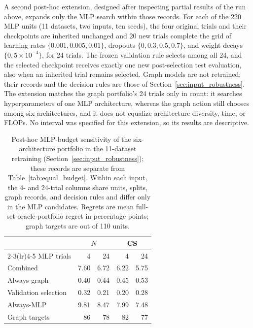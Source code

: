 A second post-hoc extension, designed after inspecting partial results of the run above, expands only the MLP search within those records. For each of the 220 MLP units (11 datasets, two inputs, ten seeds), the four original trials and their checkpoints are inherited unchanged and 20 new trials complete the grid of learning rates $\{0.001,0.005,0.01\}$, dropouts $\{0,0.3,0.5,0.7\}$, and weight decays $\{0,5\times10^{-4}\}$, for 24 trials. The frozen validation rule selects among all 24, and the selected checkpoint receives exactly one new post-selection test evaluation, also when an inherited trial remains selected. Graph models are not retrained; their records and the decision rules are those of Section~\ref{sec:input_robustness}. The extension matches the graph portfolio's 24 trials only in count: it searches hyperparameters of one MLP architecture, whereas the graph action still chooses among six architectures, and it does not equalize architecture diversity, time, or FLOPs. No interval was specified for this extension, so its results are descriptive.

\begin{table}[t]
\centering
\caption{Post-hoc MLP-budget sensitivity of the six-architecture portfolio in the 11-dataset retraining (Section~\ref{sec:input_robustness}); these records are separate from Table~\ref{tab:equal_budget}. Within each input, the 4- and 24-trial columns share units, splits, graph records, and decision rules and differ only in the MLP candidates. Regrets are mean full-set oracle-portfolio regret in percentage points; graph targets are out of 110 units.}
\label{tab:mlp_budget}
\small
\begin{tabular}{@{}lrrrr@{}}
\toprule
 & \multicolumn{2}{c}{$N$} & \multicolumn{2}{c}{CS} \\
\cmidrule(lr){2-3}\cmidrule(lr){4-5}
MLP trials & 4 & 24 & 4 & 24 \\
\midrule
Combined & 7.60 & 6.72 & 6.22 & 5.75 \\
Always-graph & 0.40 & 0.44 & 0.45 & 0.53 \\
Validation selection & 0.32 & 0.21 & 0.20 & 0.28 \\
Always-MLP & 9.81 & 8.47 & 7.99 & 7.48 \\
Graph targets & 86 & 78 & 82 & 77 \\
\bottomrule
\end{tabular}
\end{table}

